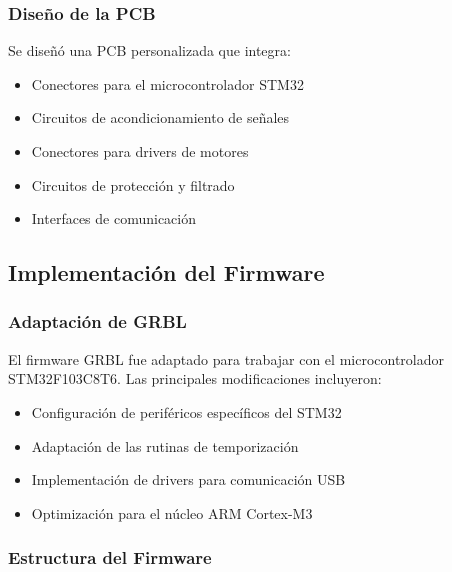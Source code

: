 \documentclass[12pt]{article}
\begin{document}
\subsubsection{Diseño de la PCB}

Se diseñó una PCB personalizada que integra:
\begin{itemize}
    \item Conectores para el microcontrolador STM32
    \item Circuitos de acondicionamiento de señales
    \item Conectores para drivers de motores
    \item Circuitos de protección y filtrado
    \item Interfaces de comunicación
\end{itemize}

\subsection{Implementación del Firmware}

\subsubsection{Adaptación de GRBL}

El firmware GRBL fue adaptado para trabajar con el microcontrolador STM32F103C8T6. Las principales modificaciones incluyeron:

\begin{itemize}
    \item Configuración de periféricos específicos del STM32
    \item Adaptación de las rutinas de temporización
    \item Implementación de drivers para comunicación USB
    \item Optimización para el núcleo ARM Cortex-M3
\end{itemize}

\subsubsection{Estructura del Firmware}

    
    
\end{document}
